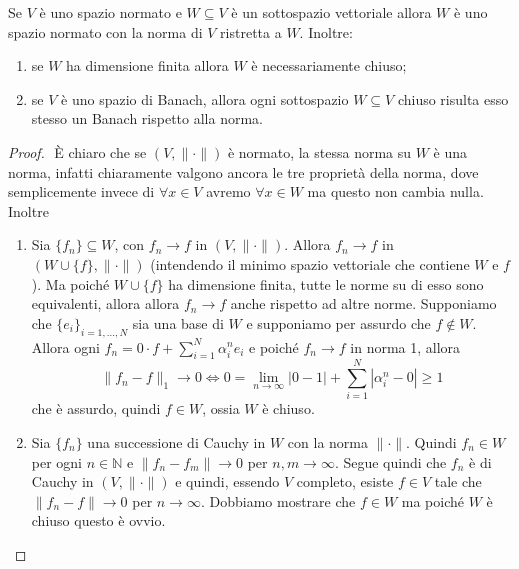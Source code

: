 \begin{proposition}
    Se \(V\) è uno spazio normato e \(W \subseteq V \) è un sottospazio
    vettoriale allora \(W\) è uno spazio normato con la norma di \(V\) ristretta
    a \(W\). Inoltre:

\begin{enumerate}[label = \alph*.]
    \item se \(W\) ha dimensione finita allora \(W\) è necessariamente chiuso;
    \item se \(V\) è uno spazio di Banach, allora ogni sottospazio \(W \subseteq
        V\) chiuso risulta esso stesso un Banach rispetto alla norma.
\end{enumerate}
\end{proposition}
\begin{proof} \( \) 
    È chiaro che se \({(V, \|\cdot \|)}\) è normato, la stessa norma su \(W\) è
    una norma, infatti chiaramente valgono ancora le tre proprietà della norma,
    dove semplicemente invece di \(\forall x \in V\) avremo \(\forall x \in W\)
    ma questo non cambia nulla. Inoltre
\begin{enumerate}[label = \alph*.]
    \item Sia \(\{f_{n}\} \subseteq W \), con \(f_{n} \to f\) in \({(V, \|\cdot
        \|)}\). Allora \(f_{n} \to f\) in \({(W \cup \{f\}, \|\cdot \|)}\) (intendendo il minimo spazio vettoriale che contiene \(W\) e \(f\)). Ma
        poiché \(W \cup  \{f\} \) ha dimensione finita, tutte le norme su di
        esso sono equivalenti, allora allora \(f_{n} \to f\)
    anche rispetto ad altre norme. Supponiamo che \({\{e_{i}\}}_{i = 1, \dots, N
    }\) sia una base di \(W\) e supponiamo per assurdo che \(f \not\in W\).
    Allora ogni \(f_{n} = 0\cdot f + \sum_{i=1}^{N} \alpha_{i}^{n} e_{i} \) e poiché
    \(f_{n} \to f\) in norma 1, allora
    \[
        \|f_{n} - f\|_1 \to 0 \iff 0=\lim_{n \to \infty} |0 - 1| + \sum_{i=1}^{N}
        |\alpha_{i}^{n} - 0| \ge  1
    \]
    che è assurdo, quindi \(f \in W\), ossia \(W\) è chiuso.
        
    \item Sia \(\{f_{n}\} \) una successione di Cauchy in \(W\) con la norma
        \(\|\cdot \|\). Quindi \(f_{n} \in W\) per ogni \(n \in \mathbb{N}\) e
        \(\| f_{n} - f_{m}\| \to 0\) per \(n, m\to \infty\). Segue quindi che
        \(f_{n}\) è di Cauchy in \({(V, \| \cdot \|)}\) e quindi, essendo \(V\)
        completo, esiste \(f \in V\) tale che \(\|f_{n} - f\| \to 0\) per \(n
        \to \infty\). Dobbiamo mostrare che \(f \in W\) ma poiché \(W\) è chiuso
        questo è ovvio.
\end{enumerate}

\end{proof}


